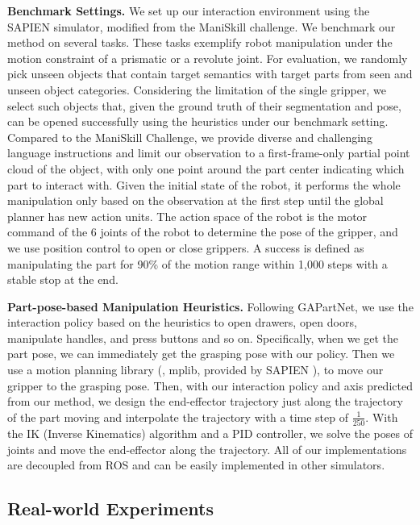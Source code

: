 \documentclass[conference]{IEEEtran}
\begin{document}
\textbf{Benchmark Settings.} We set up our interaction environment using the SAPIEN\citep{xiang2020sapien} simulator, modified from the ManiSkill challenge\citep{mu2021maniskill}. We benchmark our method on several tasks. These tasks exemplify robot manipulation under the motion constraint of a prismatic or a revolute joint. For evaluation, we randomly pick unseen objects that contain target semantics with target parts from seen and unseen object categories. Considering the limitation of the single gripper, we select such objects that, given the ground truth of their segmentation and pose, can be opened successfully using the heuristics under our benchmark setting.  Compared to the ManiSkill Challenge\citep{mu2021maniskill}, we provide diverse and challenging language instructions and limit our observation to a first-frame-only partial point cloud of the object, with only one point around the part center indicating which part to interact with. Given the initial state of the robot, it performs the whole manipulation only based on the observation at the first step until the global planner has new action units. The action space of the robot is the motor command of the 6 joints of the robot to determine the pose of the gripper, and we use position control to open or close grippers. A success is defined as manipulating the part for 90\% of the motion range within 1,000 steps with a stable stop at the end.

\textbf{Part-pose-based Manipulation Heuristics.}
Following GAPartNet\citep{geng2022gapartnet}, we use the interaction policy based on the heuristics to open drawers, open doors, manipulate handles, and press buttons and so on. Specifically, when we get the part pose, we can immediately get the grasping pose with our policy. Then we use a motion planning library (\ie, mplib, provided by SAPIEN \citep{xiang2020sapien}), to move our gripper to the grasping pose. Then, with our interaction policy and axis predicted from our method, we design the end-effector trajectory just along the trajectory of the part moving and interpolate the trajectory with a time step of $\frac{1}{250}$. With the IK (Inverse Kinematics) algorithm and a PID controller, we solve the poses of joints and move the end-effector along the trajectory. All of our implementations are decoupled from ROS and can be easily implemented in other simulators.


\subsection{Real-world Experiments}
\end{document}
